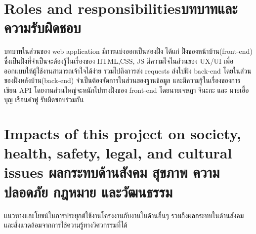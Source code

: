 \section{\ifenglish Roles and responsibilities\else บทบาทและความรับผิดชอบ\fi}
    บทบาทในส่วนของ web application มีการแบ่งออกเป็นสองฝั่ง ได้แก่ 
%
ฝั่งของหน้าบ้าน(front-end) ซึ่งเป็นฝั่งที่จำเป็นจะต้องรู้ในเรื่องของ HTML,CSS, JS มีความใจในส่วนของ UX/UI เพื่อออกแบบให้ผู้ใช้งานสามารถเจ้าใจได้ง่าย 
%
รวมไปถึงการส่ง requests ส่งไปฝั่ง back-end โดยในส่วนของฝั่งหลังบ้าน(back-end) จำเป็นต้องจัดการในส่วนของฐานข้อมูล และมีความรู้ในเรื่องของการเขียน API 
%
โดยงานส่วนใหญ่จะหนักไปทางฝั่งของ front-end โดยนายเจษฎา จินะกะ และ นายเอื้อบุญ เรือนคำฟู รับผิดชอบร่วมกัน 

\section{\ifenglish%
Impacts of this project on society, health, safety, legal, and cultural issues
\else%
ผลกระทบด้านสังคม สุขภาพ ความปลอดภัย กฎหมาย และวัฒนธรรม
\fi}

แนวทางและโยชน์ในการประยุกต์ใช้งานโครงงานกับงานในด้านอื่นๆ รวมถึงผลกระทบในด้านสังคมและสิ่งแวดล้อมจากการใช้ความรู้ทางวิศวกรรมที่ได้
